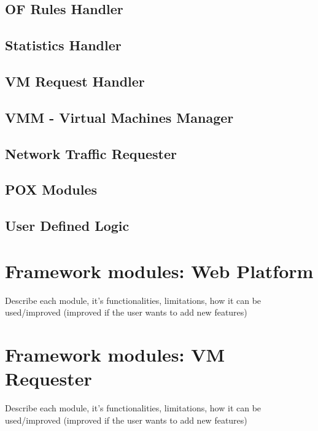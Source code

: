 \documentclass[12pt,english,oneside]{book}
\begin{document}
\subsection{OF Rules Handler}

\subsection{Statistics Handler}

\subsection{VM Request Handler}

\subsection{VMM - Virtual Machines Manager}

\subsection{Network Traffic Requester}

\subsection{POX Modules}

\subsection{User Defined Logic}

\newpage


\section{Framework modules: Web Platform}

Describe each module, it's functionalities, limitations, how it can be used/improved (improved if the user wants to add new features)

\newpage


\section{Framework modules: VM Requester}

Describe each module, it's functionalities, limitations, how it can be used/improved (improved if the user wants to add new features)

\newpage
\end{document}
